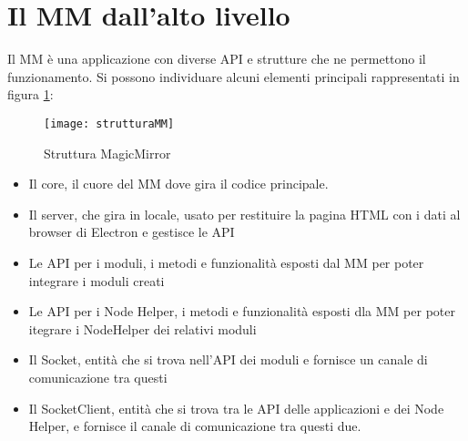 \section{Il MM dall'alto livello}\label{cap:MMalto}
Il MM \`e una applicazione con diverse API e strutture che ne permettono il funzionamento.
Si possono individuare alcuni elementi principali rappresentati in figura \ref{fig:struttMM}:
\begin{figure}[H]
    \texttt{[image: strutturaMM]}
    \caption{Struttura MagicMirror}
    \label{fig:struttMM}
\end{figure}
\begin{itemize}
\item Il core, il cuore del MM dove gira il codice principale.
\item Il server, che gira in locale, usato per restituire la pagina HTML con i dati al browser di Electron e gestisce le API
\item Le API per i moduli, i metodi e funzionalit\`a esposti dal MM per poter integrare i moduli creati
\item Le API per i Node Helper, i metodi e funzionalit\`a esposti dla MM per poter itegrare i NodeHelper
dei relativi moduli
\item Il Socket, entit\`a che si trova nell'API dei moduli e fornisce un canale di comunicazione tra questi
\item Il SocketClient, entit\`a che si trova tra le API delle applicazioni e dei Node Helper, e fornisce il canale
di comunicazione tra questi due.\\[2\baselineskip]
\end{itemize}


